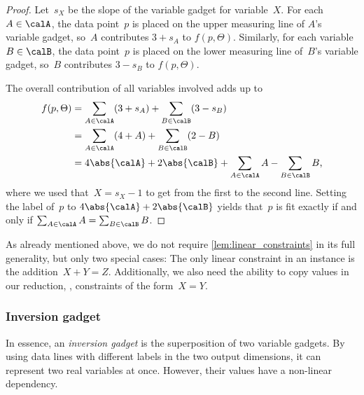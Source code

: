 \documentclass{toc}
\begin{document}
\begin{proof}
    Let~$s_X$ be the slope of the variable gadget for variable~$X$.
    For each~$A \in \calA$, the data point~$p$ is placed on the upper measuring line of $A$'s variable gadget, so~$A$ contributes $3 + s_A$ to $f(p, \Theta)$.
    Similarly, for each variable~$B \in \calB$, the data point~$p$ is placed on the lower measuring line of~$B$'s variable gadget, so~$B$ contributes $3 - s_B$ to $f(p, \Theta)$.

    The overall contribution of all %
variables involved  %
adds up to
    \begin{align*}
        f(p, \Theta)
        &= \sum_{A \in \calA} (3 + s_A) + \sum_{B \in \calB} (3 - s_B) \\
        &= \sum_{A \in \calA} (4 + A) + \sum_{B \in \calB} (2 - B) \\
        &= 4 \abs{\calA} + 2 \abs{\calB} + \sum_{A \in \calA} A - \sum_{B \in \calB} B
        \text{,}
    \end{align*}
    where we used that~$X = s_X - 1$ to get from the first to the second line.
    Setting the label of~$p$ to $4\abs{\calA} + 2\abs{\calB}$ yields that~$p$ is fit exactly if and only if $\sum_{A \in \calA} A = \sum_{B \in \calB} B$.
\end{proof}

As already mentioned above, we do not require \cref{lem:linear_constraints} in its full generality, but only two special cases:
The only linear constraint in an \ETRINV instance is the addition~$X + Y = Z$.
Additionally, we also need the ability to copy values in our reduction, \ie, constraints of the form~$X = Y$.


\subsubsection{Inversion gadget}

In essence, an \emph{inversion gadget} is the superposition of two variable gadgets.
By using data lines with different labels in the two output dimensions, it can represent two real variables at once.
However, their values have a non-linear dependency.
\end{document}
